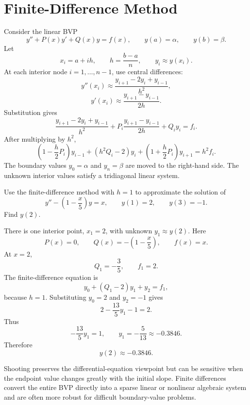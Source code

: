 \section{Finite-Difference Method}

Consider the linear BVP
\[
 y''+P(x)y'+Q(x)y=f(x),
 \qquad y(a)=\alpha,
 \qquad y(b)=\beta.
\]
Let
\[
 x_i=a+ih,
 \qquad h=\frac{b-a}{n},
 \qquad y_i\approx y(x_i).
\]
At each interior node $i=1,\ldots,n-1$, use central differences:
\[
 y''(x_i)\approx
 \frac{y_{i+1}-2y_i+y_{i-1}}{h^2},
\]
\[
 y'(x_i)\approx
 \frac{y_{i+1}-y_{i-1}}{2h}.
\]
Substitution gives
\[
 \frac{y_{i+1}-2y_i+y_{i-1}}{h^2}
 +P_i\frac{y_{i+1}-y_{i-1}}{2h}
 +Q_i y_i=f_i.
\]
After multiplying by $h^2$,
\[
 \left(1-\frac h2P_i\right)y_{i-1}
 +(h^2Q_i-2)y_i
 +\left(1+\frac h2P_i\right)y_{i+1}
 =h^2f_i.
\]
The boundary values $y_0=\alpha$ and $y_n=\beta$ are moved to the right-hand side.  The unknown interior values satisfy a tridiagonal linear system.

\begin{example}
Use the finite-difference method with $h=1$ to approximate the solution of
\[
 y''-\left(1-\frac x5\right)y=x,
 \qquad y(1)=2,
 \qquad y(3)=-1.
\]
Find $y(2)$.
\end{example}

\begin{solution}[4.2cm]
There is one interior point, $x_1=2$, with unknown $y_1\approx y(2)$.  Here
\[
 P(x)=0,
 \qquad
 Q(x)=-\left(1-\frac x5\right),
 \qquad
 f(x)=x.
\]
At $x=2$,
\[
 Q_1=-\frac35,
 \qquad f_1=2.
\]
The finite-difference equation is
\[
 y_0+(Q_1-2)y_1+y_2=f_1,
\]
because $h=1$.  Substituting $y_0=2$ and $y_2=-1$ gives
\[
 2-\frac{13}{5}y_1-1=2.
\]
Thus
\[
 -\frac{13}{5}y_1=1,
 \qquad
 y_1=-\frac5{13}\approx-0.3846.
\]
Therefore
\[
 y(2)\approx-0.3846.
\]
\end{solution}

\begin{remark}
Shooting preserves the differential-equation viewpoint but can be sensitive when the endpoint value changes greatly with the initial slope.  Finite differences convert the entire BVP directly into a sparse linear or nonlinear algebraic system and are often more robust for difficult boundary-value problems.
\end{remark}
